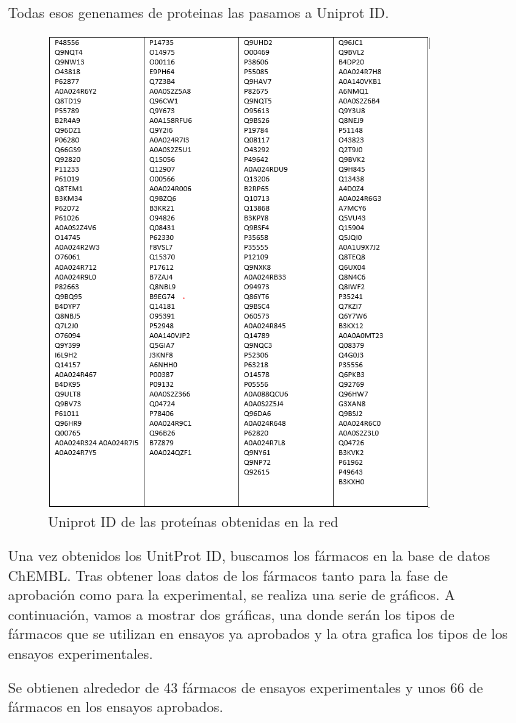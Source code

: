Todas esos genenames de proteinas las pasamos a Uniprot ID. 
		\begin{figure}[h!]
			\includegraphics[width=0.9\textwidth]{figures/Captura1.PNG}
			\caption{Uniprot ID de las proteínas obtenidas en la red}
			\label{fig:cost_megabase}
		\end{figure}
		
Una vez obtenidos los UnitProt ID, buscamos los fármacos en la base de datos ChEMBL. Tras obtener loas datos de los fármacos tanto para la fase de aprobación como para la experimental, se realiza una serie de gráficos. A continuación, vamos a mostrar dos gráficas, una donde serán los tipos de fármacos que se utilizan en ensayos ya aprobados y la otra grafica los tipos de los ensayos experimentales. 

Se obtienen alrededor de 43 fármacos de ensayos experimentales y unos 66 de fármacos en los ensayos aprobados. 

\newpage


